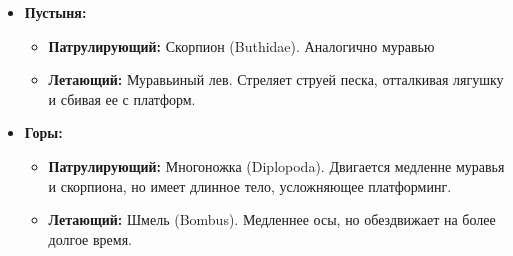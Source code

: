 \documentclass{article}
\begin{document}
\begin{enumerate}
\begin{itemize}
\begin{itemize}
\begin{itemize}
            \end {itemize}
            \item \textbf{Пустыня:}
            \begin{itemize}
                \item \textbf{Патрулирующий:} Скорпион (Buthidae). Аналогично муравью
                \item \textbf{Летающий:} Муравьиный лев. Стреляет струей песка, отталкивая лягушку и сбивая ее с платформ.
            \end {itemize}
            \item \textbf{Горы:}
            \begin{itemize}
                \item \textbf{Патрулирующий:} Многоножка (Diplopoda). Двигается медленне муравья и скорпиона, но имеет длинное тело, усложняющее платформинг.
                \item \textbf{Летающий:} Шмель (Bombus). Медленнее осы, но обездвижает на более долгое время.
            \end {itemize}
        \end {itemize}
        \end{itemize}
\end{enumerate}
\end{document}
